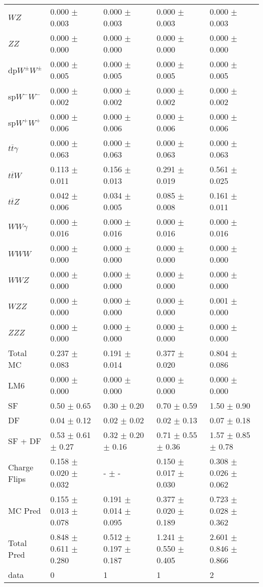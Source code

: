 \begin{tabular}{l | l l l l}
$WZ$ &  0.000 $\pm$  0.003 &  0.000 $\pm$  0.003 &  0.000 $\pm$  0.003 &  0.000 $\pm$  0.003\\
$ZZ$ &  0.000 $\pm$   0.000 &  0.000 $\pm$   0.000 &  0.000 $\pm$   0.000 &  0.000 $\pm$   0.000\\
\hline
dp$W^{\pm}W^{\pm}$ &  0.000 $\pm$  0.005 &  0.000 $\pm$  0.005 &  0.000 $\pm$  0.005 &  0.000 $\pm$  0.005\\
sp$W^{-}W^{-}$ &  0.000 $\pm$  0.002 &  0.000 $\pm$  0.002 &  0.000 $\pm$  0.002 &  0.000 $\pm$  0.002\\
sp$W^{+}W^{+}$ &  0.000 $\pm$  0.006 &  0.000 $\pm$  0.006 &  0.000 $\pm$  0.006 &  0.000 $\pm$  0.006\\
$t\overline{t}\gamma$ &  0.000 $\pm$  0.063 &  0.000 $\pm$  0.063 &  0.000 $\pm$  0.063 &  0.000 $\pm$  0.063\\
$t\overline{t}W$ &  0.113 $\pm$  0.011 &  0.156 $\pm$  0.013 &  0.291 $\pm$  0.019 &  0.561 $\pm$  0.025\\
$t\overline{t}Z$ &  0.042 $\pm$  0.006 &  0.034 $\pm$  0.005 &  0.085 $\pm$  0.008 &  0.161 $\pm$  0.011\\
$WW\gamma$ &  0.000 $\pm$  0.016 &  0.000 $\pm$  0.016 &  0.000 $\pm$  0.016 &  0.000 $\pm$  0.016\\
$WWW$ &   0.000 $\pm$   0.000 &  0.000 $\pm$   0.000 &   0.000 $\pm$   0.000 &   0.000 $\pm$   0.000\\
$WWZ$ &  0.000 $\pm$   0.000 &  0.000 $\pm$   0.000 &  0.000 $\pm$   0.000 &  0.000 $\pm$   0.000\\
$WZZ$ &   0.000 $\pm$   0.000 &   0.000 $\pm$   0.000 &   0.000 $\pm$   0.000 &  0.001 $\pm$   0.000\\
$ZZZ$ &   0.000 $\pm$   0.000 &   0.000 $\pm$   0.000 &   0.000 $\pm$   0.000 &   0.000 $\pm$   0.000\\
\hline
Total MC &  0.237 $\pm$  0.083 &  0.191 $\pm$  0.014 &  0.377 $\pm$  0.020 &  0.804 $\pm$  0.086\\
\hline\hline
\hline
LM6 &  0.000 $\pm$  0.000 &  0.000 $\pm$  0.000 &  0.000 $\pm$  0.000 &  0.000 $\pm$  0.000\\
\hline\hline
\hline\hline
 SF  & 0.50 $\pm$ 0.65 & 0.30 $\pm$ 0.20 & 0.70 $\pm$ 0.59 & 1.50 $\pm$ 0.90\\
 DF  & 0.04 $\pm$ 0.12 & 0.02 $\pm$ 0.02 & 0.02 $\pm$ 0.13 & 0.07 $\pm$ 0.18\\
\hline
 SF + DF  & 0.53 $\pm$ 0.61 $\pm$ 0.27 & 0.32 $\pm$ 0.20 $\pm$ 0.16 & 0.71 $\pm$ 0.55 $\pm$ 0.36 & 1.57 $\pm$ 0.85 $\pm$ 0.78\\
\hline\hline
Charge Flips & 0.158 $\pm$ 0.020 $\pm$ 0.032 & - $\pm$ - & 0.150 $\pm$ 0.017 $\pm$ 0.030 & 0.308 $\pm$ 0.026 $\pm$ 0.062\\
\hline\hline
\hline
MC Pred &  0.155 $\pm$  0.013 $\pm$  0.078 &  0.191 $\pm$  0.014 $\pm$  0.095 &  0.377 $\pm$  0.020 $\pm$  0.189 &  0.723 $\pm$  0.028 $\pm$  0.362\\
\hline\hline
Total Pred &  0.848 $\pm$  0.611 $\pm$  0.280 &  0.512 $\pm$  0.197 $\pm$  0.187 &  1.241 $\pm$  0.550 $\pm$  0.405 &  2.601 $\pm$  0.846 $\pm$  0.866\\
\hline\hline
data & 0 & 1 & 1 & 2\\
\hline\hline
\end{tabular}
